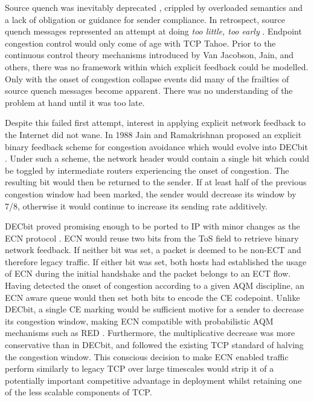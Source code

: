 Source quench was inevitably deprecated \cite{Baker:1995p479}, crippled by overloaded semantics and a lack of obligation or guidance for sender compliance.
In retrospect, source quench messages represented an attempt at doing \emph{too little, too early} \cite{Crowcroft:2003p450}.
Endpoint congestion control would only come of age with TCP Tahoe.
Prior to the continuous control theory mechanisms introduced by Van Jacobson, Jain, and others, there was no framework within which explicit feedback could be modelled.
Only with the onset of congestion collapse events did many of the frailties of source quench messages become apparent.
There was no understanding of the problem at hand until it was too late.

Despite this failed first attempt, interest in applying explicit network feedback to the Internet did not wane.
In 1988 Jain and Ramakrishnan proposed an explicit binary feedback scheme for congestion avoidance which would evolve into DECbit \cite{Ramakrishnan:1990p456}.
Under such a scheme, the network header would contain a single bit which could be toggled by intermediate routers experiencing the onset of congestion.
The resulting bit would then be returned to the sender.
If at least half of the previous congestion window had been marked, the sender would decrease its window by 7/8, otherwise it would continue to increase its sending rate additively.

DECbit proved promising enough to be ported to \ac{IP} with minor changes as the \ac{ECN} protocol \cite{Floyd:1994p491}.
\ac{ECN} would reuse two bits from the \ac{ToS} field to retrieve binary network feedback.
If neither bit was set, a packet is deemed to be non-\ac{ECT} and therefore legacy traffic.
If either bit was set, both hosts had established the usage of \ac{ECN} during the initial handshake and the packet belongs to an \ac{ECT} flow.
Having detected the onset of congestion according to a given \ac{AQM} discipline, an \ac{ECN} aware queue would then set both bits to encode the \ac{CE} codepoint.
Unlike DECbit, a single \ac{CE} marking would be sufficient motive for a sender to decrease its congestion window, making \ac{ECN} compatible with probabilistic \ac{AQM} mechanisms such as \ac{RED} \cite{Floyd:1993p492}.
Furthermore, the multiplicative decrease was more conservative than in DECbit, and followed the existing \ac{TCP} standard of halving the congestion window.
This conscious decision to make \ac{ECN} enabled traffic perform similarly to legacy \ac{TCP} over large timescales would strip it of a potentially important competitive advantage in deployment whilst retaining one of the less scalable components of \ac{TCP}.

